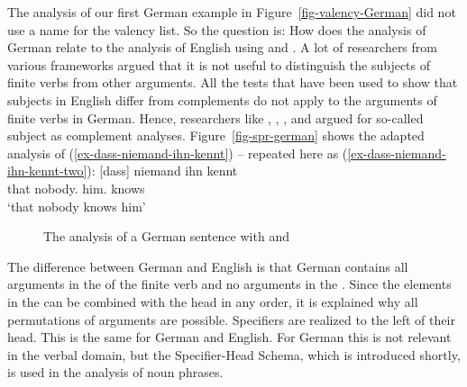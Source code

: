 The analysis of our first German example in Figure~\ref{fig-valency-German} did not use a name
for the valency list. So the question is: How does the analysis of German relate to the analysis of
English using \spr and \comps. A lot of researchers from various frameworks argued that it is not
useful to distinguish the subjects of finite verbs from other arguments. All the tests that have
been used to show that subjects in English differ from complements do not apply to the arguments of
finite verbs in German. Hence, researchers like \citet{Pollard90a}, \citet{Haider93a}, 
\citet[]{Eisenberg94b}, and \citet{Kiss95a} argued for so-called subject as complement
analyses. Figure~\vref{fig-spr-german} shows the adapted analysis of
(\ref{ex-dass-niemand-ihn-kennt}) -- repeated here as
(\ref{ex-dass-niemand-ihn-kennt-two}):
\ea
\label{ex-dass-niemand-ihn-kennt-two}
\gll  {}[dass] niemand ihn kennt\\
      \spacebr{}that nobody.\NOM{} him.\ACC{} knows\\ 
\glt `that nobody knows him'
\z
\begin{figure}
\caption{\label{fig-spr-german}The analysis of a German sentence with \spr and \compsl}
\end{figure}
The difference between German and English is that German contains all arguments in the \compsl of
the finite verb and no arguments in the \sprl. Since the elements in the \compsl can be combined
with the head in any order, it is explained why all permutations of arguments are
possible. Specifiers are realized to the left of their head. This is the same for German and
English. For German this is not relevant in the verbal domain, but the Specifier-Head Schema, which
is introduced shortly, is used in the analysis of noun phrases.

